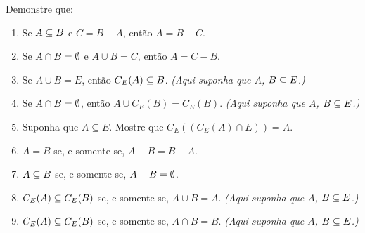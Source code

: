 \documentclass[12pt]{exam}
\begin{document}
\newpage
\questao{} Demonstre que:
\begin{enumerate}[label={\alph*})]

    \item Se $A \subseteq B$ e $C = B - A$, ent\~ao $A = B - C$.

    \item Se $A \cap B = \emptyset$ e $A \cup B = C$, ent\~ao $A = C - B$.

    \item Se $A\cup B = E$, ent\~ao $C_E(A) \subseteq B$. \textit{(Aqui suponha que $A$, $B \subseteq E$.)}

    \item Se $A \cap B = \emptyset$, ent\~ao $A \cup C_E(B) = C_E(B)$. \textit{(Aqui suponha que $A$, $B \subseteq E$.)}

    \item Suponha que $A \subseteq E$. Mostre que $C_E((C_E(A) \cap E)) = A$.

    \item $A = B$ se, e somente se, $A - B = B - A$.

    \item $A \subseteq B$ se, e somente se, $A - B = \emptyset$.

    \item $C_E(A) \subseteq C_E(B)$ se, e somente se, $A \cup B = A$. \textit{(Aqui suponha que $A$, $B \subseteq E$.)}

    \item $C_E(A) \subseteq C_E(B)$ se, e somente se, $A \cap B = B$. \textit{(Aqui suponha que $A$, $B \subseteq E$.)}

\end{enumerate}

\vspace{.3cm}
\end{document}
